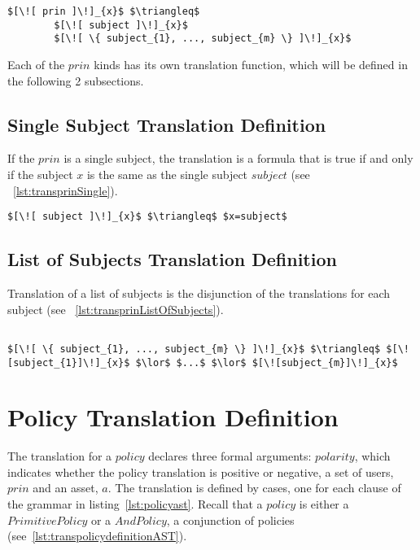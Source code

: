 \lstset{mathescape, language=AST}  
\begin{lstlisting}[frame=single, caption={Prin Translation Definition},label={lst:transprindefinitionAST}]
$[\![ prin ]\!]_{x}$ $\triangleq$ 
        $[\![ subject ]\!]_{x}$
        $[\![ \{ subject_{1}, ..., subject_{m} \} ]\!]_{x}$
\end{lstlisting}

Each of the $prin$ kinds has its own translation function, which will be defined in the following 2 subsections.



\subsection{Single Subject Translation Definition}
If the $prin$ is a single subject, the translation is a formula that is true if and only if the subject $x$ is the same as the single subject $subject$ (see ~\ref{lst:transprinSingle}).

\lstset{mathescape, language=AST}  
\begin{lstlisting}[frame=single, caption={Prin Translation Definition {$\colon$} Single subject},label={lst:transprinSingle}]
$[\![ subject ]\!]_{x}$ $\triangleq$ $x=subject$
\end{lstlisting}

\subsection{List of Subjects Translation Definition}
Translation of a list of subjects is the disjunction of the translations for each subject (see ~\ref{lst:transprinListOfSubjects}).

\lstset{mathescape, language=AST}  
\begin{lstlisting}[frame=single, caption={Prin Translation Definition {$\colon$} List of subjects},label={lst:transprinListOfSubjects}]

$[\![ \{ subject_{1}, ..., subject_{m} \} ]\!]_{x}$ $\triangleq$ $[\![subject_{1}]\!]_{x}$ $\lor$ $...$ $\lor$ $[\![subject_{m}]\!]_{x}$

\end{lstlisting}

\section{Policy Translation Definition}
The translation for a $policy$ declares three formal arguments: $polarity$, which indicates whether the policy translation is positive or negative, a set of users, $prin$ and an asset, $a$.
The translation is defined by cases, one for each clause of the grammar in listing~\ref{lst:policyast}. Recall that a $policy$ is either a $PrimitivePolicy$ or a $AndPolicy$, a conjunction of policies (see~\ref{lst:transpolicydefinitionAST}).


